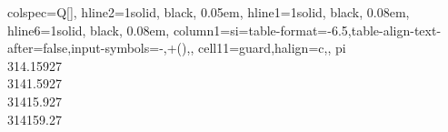 \begin{table}
\centering
\begin{tblr}[         %
]                     %
{                     %
colspec={Q[]},
hline{2}={1}{solid, black, 0.05em},
hline{1}={1}{solid, black, 0.08em},
hline{6}={1}{solid, black, 0.08em},
column{1}={si={table-format=-6.5,table-align-text-after=false,input-symbols={-,\*+()}},},
cell{1}{1}={guard,halign=c,},
}                     %
pi \\
314.15927 \\
3141.5927 \\
31415.927 \\
314159.27 \\
\end{tblr}
\end{table} 
